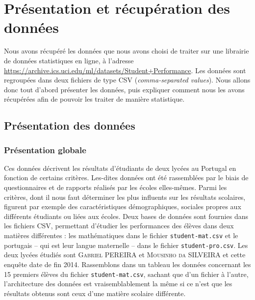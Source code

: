 \documentclass[11pt]{article}
\begin{document}
\section{Présentation et récupération des données}

Nous avons récupéré les données que nous avons choisi de traiter sur une librairie de données statistiques en ligne, à l'adresse \url{https://archive.ics.uci.edu/ml/datasets/Student+Performance}. Les données sont regroupées dans deux fichiers de type CSV (\emph{comma-separated values}).  Nous allons donc tout d'abord présenter les données, puis expliquer comment nous les avons récupérées afin de pouvoir les traiter de manière statistique.
~\\

\subsection{Présentation des données}
\subsubsection{Présentation globale}
Ces données décrivent les résultats d'étudiants de deux lycées au Portugal en fonction de certains critères. Les-dites données ont été rassemblées par le biais de questionnaires et de rapports réalisés par les écoles elles-mêmes. Parmi les critères, dont il nous faut déterminer les plus influents sur les résultats scolaires, figurent par exemple des caractéristiques démographiques, sociales  propres aux différents étudiants ou liées aux écoles. Deux bases de données sont fournies dans les fichiers CSV, permettant d'étudier les performances des élèves dans deux matières différentes : les mathématiques dans le fichier \texttt{student-mat.csv} et le portugais \--- qui est leur langue maternelle \--- dans le fichier \texttt{student-pro.csv}. Les deux lycées étudiés sont \textsc{Gabriel PEREIRA} et \textsc{Mousinho da SILVEIRA} et cette enquête date de fin 2014. Rassemblons dans un tableau les données concernant les 15 premiers élèves du fichier \texttt{student-mat.csv}, sachant que d'un fichier à l'autre, l'architecture des données est vraisemblablement la même si ce n'est que les résultats obtenus sont ceux d'une matière scolaire différente.
~\\\\\\\\\\
\end{document}
